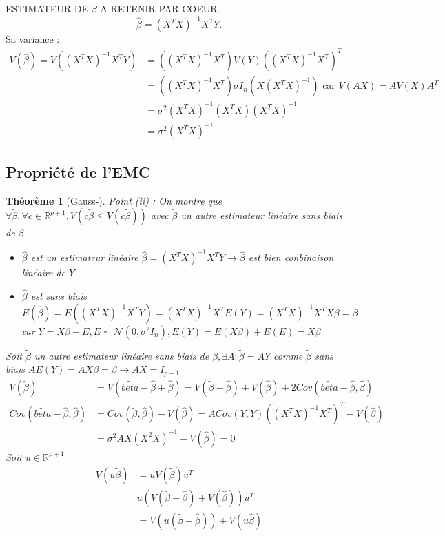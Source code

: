 \documentclass{article}
\theoremstyle{plain}%
\newtheorem{thm}{Théorème}[section]
\theoremstyle{definition}
\theoremstyle{remark}
\begin{document}
ESTIMATEUR DE $ \beta  $ A RETENIR PAR COEUR 
\[
    \hat{\beta }  = (X^TX)^{-1}X^T Y
.\]
Sa variance : 
\begin{align*}
    V (\hat{\beta }) = V((X^TX)^{-1}X^T Y) &= ((X^TX)^{-1}X^T)V(Y)((X^TX)^{-1}X^T)^T \\
        &= ((X^TX)^{-1}X^T) \sigma I_n (X (X^TX)^{-1}) \text{ car } V(AX) = AV(X)A^T \\
        &= \sigma ^2 (X^TX)^{-1}(X^T X)(X^T X)^{-1} \\
        &= \sigma ^2 (X^T X)^{-1}
\end{align*}

\subsection{Propriété de l'EMC}
\begin{thm}[Gauss-]
    Point (ii) : On montre que $ \forall \tilde{\beta }, \forall c \in \mathbb{R}^{p+1}, V(c \tilde{\beta } \leq V(c \tilde{\beta })) $ avec $ \tilde{\beta } $ un autre estimateur linéaire sans biais de $ \beta  $ \begin{itemize}
        \item $ \hat{\beta } $ est un estimateur linéaire $ \hat{\beta } = (X^TX)^{-1} X^T Y \to \hat{\beta } $ est bien conbinaison linéaire de $ Y $  
        \item $ \hat{\beta } $ est sans biais $ E(\hat{\beta }) = E((X^T X)^{-1}X^T Y) = (X^TX)^{-1}X^T E(Y) = (X^TX)^{-1} X^T X \beta  = \beta $ car $ Y= X \beta + E, E \sim \mathcal{N}(0, \sigma ^2 I_n), E(Y)= E(X \beta ) + E(E) = X \beta  $ 
    \end{itemize}
    Soit $ \tilde{\beta } $ un autre estimateur linéaire sans biais de $ \beta , \exists A : \tilde{\beta } = AY $ comme $ \tilde{\beta } $ sans biais $ AE(Y)=AX \beta = \beta \to AX = I_{p+1} $ \begin{align*}
        V(\tilde{\beta }) &= V(\tilde{beta} - \hat{\beta } + \hat{\beta }) = V(\tilde{\beta } - \hat{\beta }) + V(\hat{\beta }) + 2 Cov(\tilde{beta} - \hat{\beta }, \hat{\beta }) \\
        Cov(\tilde{beta} - \hat{\beta }, \hat{\beta }) &= Cov(\tilde{\beta}, \hat{\beta}) - V(\hat{\beta}) = A Cov(Y,Y) ( (X^TX)^{-1} X^T)^T - V(\hat{\beta}) \\
            &= \sigma ^2 A X (X^2X)^{-1} - V(\hat{\beta}) = 0
    \end{align*}
    Soit $ u \in \mathbb{R}^{p+1}$ \begin{align*}
        V(u \tilde{\beta}) &= u V(\tilde{\beta})u^T \\
            & u (V(\tilde{\beta } - \hat{\beta}) + V(\hat{\beta})) u^T \\
            &= V(u(\tilde{\beta} - \hat{\beta})) + V(u \hat{\beta})
    \end{align*} 
\end{thm}
\end{document}
